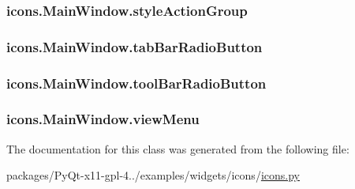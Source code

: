 \subsubsection[{style\+Action\+Group}]{\setlength{\rightskip}{0pt plus 5cm}icons.\+Main\+Window.\+style\+Action\+Group}\label{classicons_1_1MainWindow_aa57049e2bef1a34e7cf99a12a6d68d83}
\hypertarget{classicons_1_1MainWindow_afc8cc90979c02dc8412e60dc289084f9}{}
\subsubsection[{tab\+Bar\+Radio\+Button}]{\setlength{\rightskip}{0pt plus 5cm}icons.\+Main\+Window.\+tab\+Bar\+Radio\+Button}\label{classicons_1_1MainWindow_afc8cc90979c02dc8412e60dc289084f9}
\hypertarget{classicons_1_1MainWindow_a25da9e2984e5a668bfa84e0f920ec417}{}
\subsubsection[{tool\+Bar\+Radio\+Button}]{\setlength{\rightskip}{0pt plus 5cm}icons.\+Main\+Window.\+tool\+Bar\+Radio\+Button}\label{classicons_1_1MainWindow_a25da9e2984e5a668bfa84e0f920ec417}
\hypertarget{classicons_1_1MainWindow_a59c651f34203229a72e2a8ea99ed3056}{}
\subsubsection[{view\+Menu}]{\setlength{\rightskip}{0pt plus 5cm}icons.\+Main\+Window.\+view\+Menu}\label{classicons_1_1MainWindow_a59c651f34203229a72e2a8ea99ed3056}


The documentation for this class was generated from the following file\+:\begin{DoxyCompactItemize}
\item 
packages/\+Py\+Qt-\/x11-\/gpl-\/4../examples/widgets/icons/\hyperlink{icons_8py}{icons.\+py}\end{DoxyCompactItemize}
